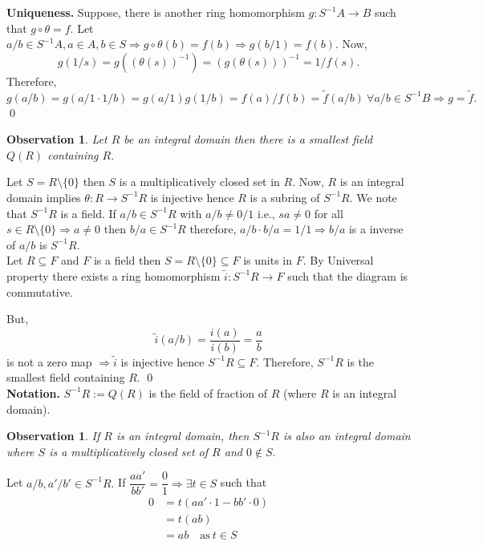 \documentclass[11pt]{amsart}
\newtheorem{obs}[theorem]{Observation}
\begin{document}
\textbf{Uniqueness.} Suppose, there is another ring homomorphism $g:S^{-1}A\to B$ such that $g\circ \theta=f.$ Let $a/b \in S^{-1}A,a\in A,b\in S \Rightarrow g\circ \theta(b)=f(b) \Rightarrow g(b/1)=f(b).$ Now, $$g(1/s)=g((\theta(s))^{-1})=(g(\theta(s)))^{-1}=1/f(s).$$ Therefore, $g(a/b)=g(a/1\cdot 1/b)=g(a/1)g(1/b)=f(a)/f(b)=\tilde{f}(a/b)~\forall a/b \in S^{-1}B \Rightarrow g=\tilde{f}.$ \qed
\begin{obs}
Let $R$ be an integral domain then there is a smallest field $Q(R)$ containing $R.$
\end{obs}
\proof Let $S=R\setminus \{0\}$ then $S$ is a multiplicatively closed set in $R.$ Now, $R$ is an integral domain implies $\theta:R \to S^{-1}R$ is injective hence $R$ is a subring of $S^{-1}R.$ We note that $S^{-1}R$ is a field. If $a/b\in S^{-1}R$ with $a/b\neq 0/1$ i.e., $sa\neq 0$ for all $s\in R\setminus \{0\} \Rightarrow a\neq 0$ then $b/a \in S^{-1}R$ therefore, $a/b\cdot b/a=1/1 \Rightarrow b/a$ is a inverse of $a/b$ is $S^{-1}R.$\\
Let $R\subseteq F$ and $F$ is a field then $S=R\setminus \{0\}\subseteq F$ is units in $F.$ By Universal property there exists a ring homomorphism $\tilde{i}:S^{-1}R \to F$ such that the diagram is commutative.
\begin{center}
\end{center} But, 
$$\tilde{i}(a/b)=\dfrac{i(a)}{i(b)}=\dfrac{a}{b}$$ is not a zero map $\Rightarrow \tilde{i}$ is injective hence $S^{-1}R\subseteq F.$ Therefore, $S^{-1}R$ is the smallest field containing $R.$ \qed\\
\textbf{Notation.} $S^{-1}R:=Q(R)$ is the field of fraction of $R$ (where $R$ is an integral domain).
\begin{obs}
If $R$ is an integral domain, then $S^{-1}R$ is also an integral domain where $S$ is a multiplicatively closed set of $R$ and $0\notin S.$
\end{obs}
\proof Let $a/b,a'/b' \in S^{-1}R.$ If $\dfrac{aa'}{bb'}=\dfrac{0}{1} \Rightarrow \exists t\in S$ such that \begin{align*}
0&=t(aa'\cdot 1-bb'\cdot 0)\\
&=t(ab)\\
&=ab\quad \text{as}~t\in S\\
\end{align*} 
\end{document}
